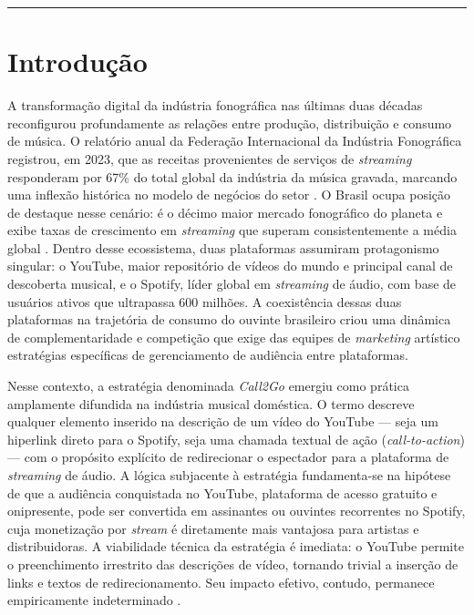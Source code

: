 \documentclass[12pt, a4paper]{article}
\begin{document}
\vspace{0.4cm}
\hrule
\vspace{0.4cm}

\section{Introdução}

A transformação digital da indústria fonográfica nas últimas duas décadas reconfigurou profundamente as relações entre produção, distribuição e consumo de música. O relatório anual da Federação Internacional da Indústria Fonográfica registrou, em 2023, que as receitas provenientes de serviços de \textit{streaming} responderam por 67\% do total global da indústria da música gravada, marcando uma inflexão histórica no modelo de negócios do setor \cite{ifpi2023}. O Brasil ocupa posição de destaque nesse cenário: é o décimo maior mercado fonográfico do planeta e exibe taxas de crescimento em \textit{streaming} que superam consistentemente a média global \cite{ifpi2023}. Dentro desse ecossistema, duas plataformas assumiram protagonismo singular: o YouTube, maior repositório de vídeos do mundo e principal canal de descoberta musical, e o Spotify, líder global em \textit{streaming} de áudio, com base de usuários ativos que ultrapassa 600 milhões. A coexistência dessas duas plataformas na trajetória de consumo do ouvinte brasileiro criou uma dinâmica de complementaridade e competição que exige das equipes de \textit{marketing} artístico estratégias específicas de gerenciamento de audiência entre plataformas.

Nesse contexto, a estratégia denominada \textit{Call2Go} emergiu como prática amplamente difundida na indústria musical doméstica. O termo descreve qualquer elemento inserido na descrição de um vídeo do YouTube --- seja um hiperlink direto para o Spotify, seja uma chamada textual de ação (\textit{call-to-action}) --- com o propósito explícito de redirecionar o espectador para a plataforma de \textit{streaming} de áudio. A lógica subjacente à estratégia fundamenta-se na hipótese de que a audiência conquistada no YouTube, plataforma de acesso gratuito e onipresente, pode ser convertida em assinantes ou ouvintes recorrentes no Spotify, cuja monetização por \textit{stream} é diretamente mais vantajosa para artistas e distribuidoras. A viabilidade técnica da estratégia é imediata: o YouTube permite o preenchimento irrestrito das descrições de vídeo, tornando trivial a inserção de links e textos de redirecionamento. Seu impacto efetivo, contudo, permanece empiricamente indeterminado \cite{wlomert2016}.
\end{document}
